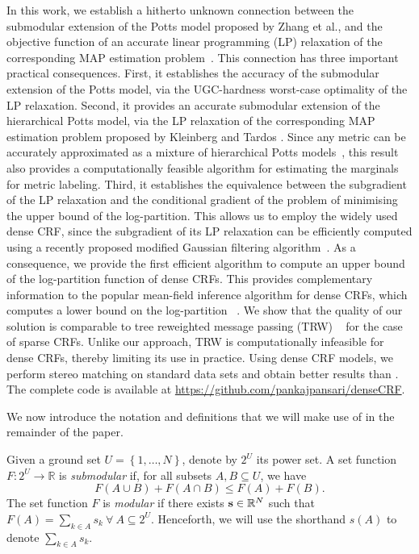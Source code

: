 In this work, we establish a hitherto unknown connection between the submodular
extension of the Potts model proposed by Zhang et al.\citep{zhang2015higher}, and the
objective function of an accurate linear programming (LP) relaxation of the
corresponding MAP estimation problem~\citep{kleinberg2002approximation}. This
connection has three important practical consequences. First, it establishes
the accuracy of the submodular extension of the Potts model, via the
UGC-hardness worst-case optimality of the LP relaxation. Second, it provides an
accurate submodular extension of the hierarchical Potts model, via the LP
relaxation of the corresponding MAP estimation problem proposed
by Kleinberg and Tardos \citep{kleinberg2002approximation}. Since any metric can be accurately
approximated as a mixture of hierarchical Potts
models~\citep{bartal1996probabilistic, bartal1998approximating}, this result
also provides a computationally feasible algorithm for estimating the marginals
for metric labeling. Third, it establishes the equivalence between the
subgradient of the LP relaxation and the conditional gradient of the problem of
minimising the upper bound of the log-partition. This allows us to employ the
widely used dense CRF, since the subgradient of its LP relaxation can be
efficiently computed using a recently proposed modified Gaussian filtering
algorithm~\citep{ajanthan2017efficient}. As a consequence, we provide the first
efficient algorithm to compute an upper bound of the log-partition function of
dense CRFs. This provides complementary information to the popular mean-field
inference algorithm for dense CRFs, which computes a lower bound on the
log-partition ~\citep{koltun2011efficient}. We show that the quality of our
solution is comparable to tree reweighted message passing (TRW)
~\citep{wainwright2005new} for the case of sparse CRFs. Unlike our approach,
TRW is computationally infeasible for dense CRFs, thereby limiting its use in
practice. Using dense CRF models, we perform stereo matching on standard
data sets and obtain better results than \citep{koltun2011efficient}. The complete code is available at \url{https://github.com/pankajpansari/denseCRF}.

\label{sec:prelim}

We now introduce the notation and definitions that we will make use of in the remainder of the paper.

 Given a ground set $U = \left\{1, \dots, N \right\}$, denote by $2^U$ its power set. A set function $F: 2^U \to \mathbb{R}$ is {\it submodular} if, for all subsets $A, B \subseteq U$, we have
\begin{equation}
    F(A \cup B) + F(A \cap B) \leq F(A) + F(B).
\end{equation}
The set function $F$ is {\it modular} if there exists ${\bf s} \in \mathbb{R}^N$ such that $F(A) = \sum_{k \in A} s_k \ \forall \ A \subseteq 2^U$. Henceforth, we will use the shorthand $s(A)$ to denote ${\sum_{k \in A}} s_k$.

